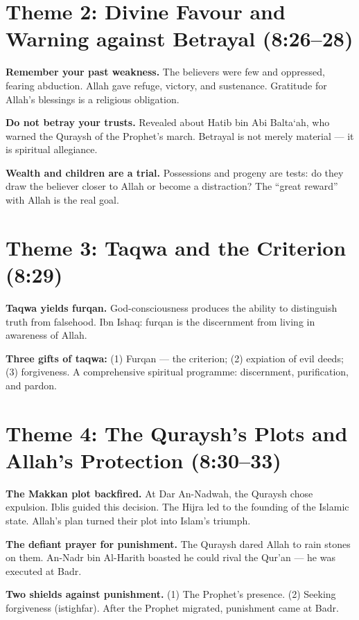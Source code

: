 \documentclass[11pt,a4paper,openany]{book}
\begin{document}
\section{Theme 2: Divine Favour and Warning against Betrayal (8:26--28)}
\begin{themebox}
\textbf{Remember your past weakness.} The believers were few and oppressed, fearing abduction. Allah gave refuge, victory, and sustenance. Gratitude for Allah's blessings is a religious obligation.

\textbf{Do not betray your trusts.} Revealed about Hatib bin Abi Balta`ah, who warned the Quraysh of the Prophet's march. Betrayal is not merely material --- it is spiritual allegiance.

\textbf{Wealth and children are a trial.} Possessions and progeny are tests: do they draw the believer closer to Allah or become a distraction? The ``great reward'' with Allah is the real goal.
\end{themebox}

\section{Theme 3: Taqwa and the Criterion (8:29)}
\begin{themebox}
\textbf{Taqwa yields furqan.} God-consciousness produces the ability to distinguish truth from falsehood. Ibn Ishaq: furqan is the discernment from living in awareness of Allah.

\textbf{Three gifts of taqwa:} (1) Furqan --- the criterion; (2) expiation of evil deeds; (3) forgiveness. A comprehensive spiritual programme: discernment, purification, and pardon.
\end{themebox}

\section{Theme 4: The Quraysh's Plots and Allah's Protection (8:30--33)}
\begin{themebox}
\textbf{The Makkan plot backfired.} At Dar An-Nadwah, the Quraysh chose expulsion. Iblis guided this decision. The Hijra led to the founding of the Islamic state. Allah's plan turned their plot into Islam's triumph.

\textbf{The defiant prayer for punishment.} The Quraysh dared Allah to rain stones on them. An-Nadr bin Al-Harith boasted he could rival the Qur'an --- he was executed at Badr.

\textbf{Two shields against punishment.} (1) The Prophet's presence. (2) Seeking forgiveness (istighfar). After the Prophet migrated, punishment came at Badr.
\end{themebox}
\end{document}
